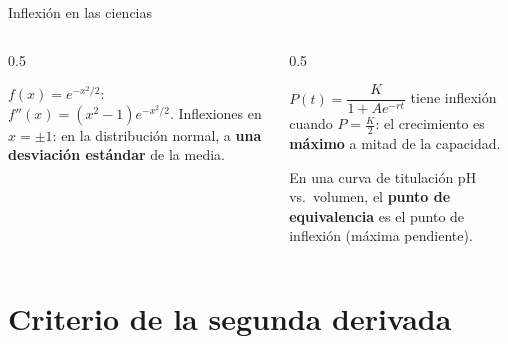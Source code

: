 \documentclass[10pt,aspectratio=169]{beamer}
\begin{document}
\begin{frame}{Inflexión en las ciencias}
  \begin{columns}
    \begin{column}{0.5\textwidth}
      \begin{ejemplo}
        $f(x)=e^{-x^2/2}$: \ $f''(x)=(x^2-1)e^{-x^2/2}$.
        Inflexiones en $x=\pm1$: en la distribución normal, a \textbf{una desviación estándar} de la media.
      \end{ejemplo}
      \centering
    \end{column}
    \begin{column}{0.5\textwidth}
      \begin{ejemplo}
        $P(t)=\dfrac{K}{1+Ae^{-rt}}$ tiene inflexión cuando $P=\frac K2$: el crecimiento es \textbf{máximo} a mitad de la capacidad.
      \end{ejemplo}
      \begin{ejemplo}[4: titulación]
        En una curva de titulación pH vs.\ volumen, el \textbf{punto de equivalencia} es el punto de inflexión (máxima pendiente).
      \end{ejemplo}
      \centering
    \end{column}
  \end{columns}
\end{frame}

\section{Criterio de la segunda derivada}
\end{document}
